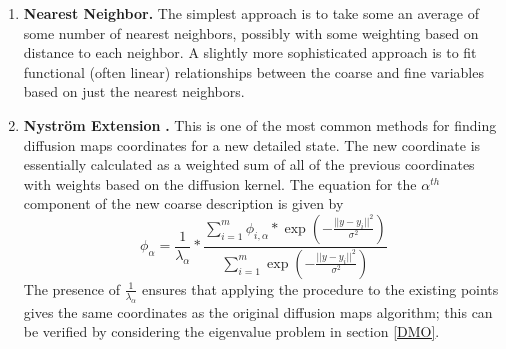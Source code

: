 \documentclass[12pt]{article}
\begin{document}
\begin{enumerate}
\item \textbf{Nearest Neighbor.} The simplest approach is to take some an average of some number of nearest neighbors, possibly with some weighting based on distance to each neighbor. A slightly more sophisticated approach is to fit functional (often linear) relationships between the coarse and fine variables based on just the nearest neighbors.
\item \textbf{Nystr\"om Extension }\cite{Fowlkes2004}\textbf{.}   This is one of the most common methods for finding diffusion maps coordinates for a new detailed state. The new coordinate is essentially calculated as a weighted sum of all of the previous coordinates with weights based on the diffusion kernel. The equation for the $\alpha^{th}$ component of the new coarse description is given by
\[
\phi_{\alpha} = \frac{1}{\lambda_\alpha}*\frac{\sum_{i=1}^m \phi_{i,\alpha}*\exp\left(-\frac{||y-y_i||^2}{\sigma ^2}\right)}{\sum_{i=1}^m \exp\left(-\frac{||y-y_i||^2}{\sigma ^2}\right)}
\]
The presence of $\frac{1}{\lambda_\alpha}$ ensures that applying the procedure to the existing points gives the same coordinates as the original diffusion maps algorithm; this can be verified by considering the eigenvalue problem in section \ref{DMO}. \vspace{1mm}


\end{enumerate}
\end{document}
